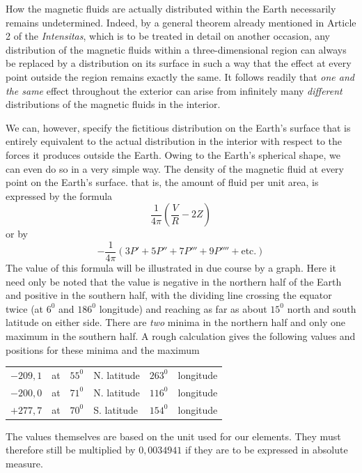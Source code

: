 How the magnetic fluids are actually distributed within the Earth necessarily remains undetermined. Indeed, by a general theorem already mentioned in Article 2 of the \textit{Intensitas}, which is to be treated in detail on another occasion, any distribution of the magnetic fluids within a three-dimensional region can always be replaced by a distribution on its surface in such a way that the effect at every point outside the region remains exactly the same. It follows readily that \textit{one and the same} effect throughout the exterior can arise from infinitely many \textit{different} distributions of the magnetic fluids in the interior.

We can, however, specify the fictitious distribution on the Earth's surface that is entirely equivalent to the actual distribution in the interior with respect to the forces it produces outside the Earth. Owing to the Earth's spherical shape, we can even do so in a very simple way. The density of the magnetic fluid at every point on the Earth's surface. that is, the amount of fluid per unit area, is expressed by the formula
\[
\frac1{4\pi}(\frac VR-2Z)
\]
or by
\[
-\frac1{4\pi}(3P'+5P''+7P'''+9P''''+\text{etc.})
\]
The value of this formula will be illustrated in due course by a graph. Here it need only be noted that the value is negative in the northern half of the Earth and positive in the southern half, with the dividing line crossing the equator twice (at $6^0$ and $186^0$ longitude) and reaching as far as about $15^0$ north and south latitude on either side. There are \textit{two} minima in the northern half and only one maximum in the southern half. A rough calculation gives the following values and positions for these minima and the maximum
\begin{center}
\begin{tabular}{rlrlrl}
$-209{,}1$&at&$55^0$&N. latitude&$263^0$&longitude\\
$-200{,}0$&at&$71^0$&N. latitude&$116^0$&longitude\\
$+277{,}7$&at&$70^0$&S. latitude&$154^0$&longitude
\end{tabular}
\end{center}
The values themselves are based on the unit used for our elements. They must therefore still be multiplied by $0{,}0034941$ if they are to be expressed in absolute measure.

